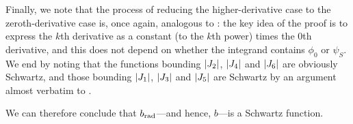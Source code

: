 \begin{comment}
\begin{boxlemma}\label{Ch4:Lemma:Bound_J4}
    There exists a positive real number $C_S'$ such that for all $r \in \R$,
    \begin{align*}
        \abs{J_2(r)} \leq C_S' \, e^{-\pi r}
    \end{align*}
\end{boxlemma}
\begin{proof}
    Parametrise $z = 1 + i - t$ in \eqref{Ch4:Eq:J4_like_I4}. Then, for all $r \in \R$, we can write
    \begin{align*}
        J_4(r) &= -\int_{0}^{1} \psi_S\of{\frac{1 + i - t}{t - i}} \, \parenth{i-t}^2 \, e^{i \pi r} \, e^{-\pi r} \, e^{-i \pi r t} \, \diff{t}
    \end{align*}
    It is enough to show that we can use \eqref{Ch4:Eq:PolyFourierCoeffBound_psi_S}. To that end, consider the expression inside $\psi_S$:
    \begin{align*}
        \frac{1 + i - t}{t - i}
        = \frac{-t^2 + t + 1}{t^2 + 1} + \frac{1}{t^2 + 1}i
    \end{align*}
    Clearly, for $t \in \parenth{0, 1}$, the imaginary part of the above is greater than $\frac{1}{2}$. So, we can bound the $\psi_S$ factor using \eqref{Ch4:Eq:PolyFourierCoeffBound_psi_S}, and the rest of the proof is analogous to that of \Cref{Ch4:Lemma:Bound_I2_I4}.
\end{proof}
\end{comment}

Finally, we note that the process of reducing the higher-derivative case to the zeroth-derivative case is, once again, analogous to : the key idea of the proof is to express the $k$th derivative as a constant (to the $k$th power) times the $0$th derivative, and this does not depend on whether the integrand contains $\phi_0$ or $\psi_S$. We end by noting that the functions bounding $\left\lvert J_2 \right\rvert$, $\left\lvert J_4 \right\rvert$ and $\left\lvert J_6 \right\rvert$ are obviously Schwartz, and those bounding $\left\lvert J_1 \right\rvert$, $\left\lvert J_3 \right\rvert$ and $\left\lvert J_5 \right\rvert$ are Schwartz by an argument almost verbatim to .

We can therefore conclude that $b_{\operatorname{rad}}$---and hence, $b$---is a Schwartz function.